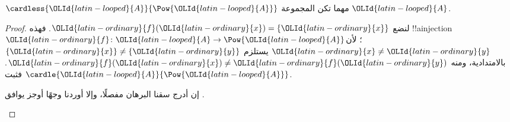 \documentclass[../../../include/open-logic-section]{subfiles}
\begin{document}
\begin{thm}[كانتور]
$\cardless{{\OLId{latin-looped}{A}}}{\Pow{{\OLId{latin-looped}{A}}}}$ مهما تكن المجموعة ${\OLId{latin-looped}{A}}$.
\end{thm}

\begin{proof}
لنضع ${\OLId{latin-ordinary}{f}}({\OLId{latin-ordinary}{x}}) = \{{\OLId{latin-ordinary}{x}}\}$. فهذه !!a{injection} ${\OLId{latin-ordinary}{f}} \colon {\OLId{latin-looped}{A}} \to \Pow{{\OLId{latin-looped}{A}}}$؛ لأن ${\OLId{latin-ordinary}{x}} \neq {\OLId{latin-ordinary}{y}}$ يستلزم $\{{\OLId{latin-ordinary}{x}}\} \neq \{{\OLId{latin-ordinary}{y}}\}$ بالامتدادية، ومنه ${\OLId{latin-ordinary}{f}}({\OLId{latin-ordinary}{x}}) \neq {\OLId{latin-ordinary}{f}}({\OLId{latin-ordinary}{y}})$. فثبت $\cardle{{\OLId{latin-looped}{A}}}{\Pow{{\OLId{latin-looped}{A}}}}$.

\begin{editorial}
إن أدرج  سقنا البرهان مفصلًا، وإلا أوردنا وجهًا أوجز يوافق .
\end{editorial}


\end{proof}
\end{document}
